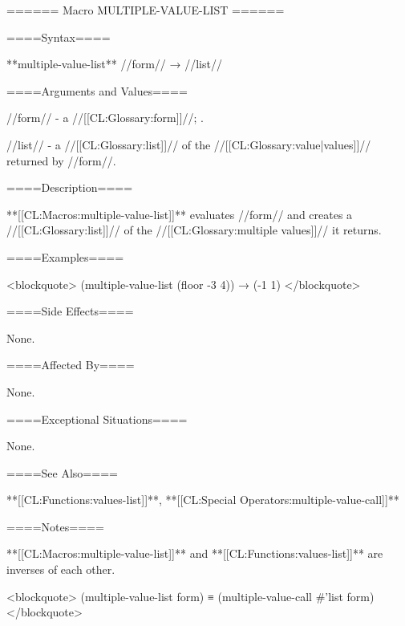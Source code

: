====== Macro MULTIPLE-VALUE-LIST ======

====Syntax====

**multiple-value-list** //form// → //list//

====Arguments and Values====

//form// - a //[[CL:Glossary:form]]//; \evalspecial.

//list// - a //[[CL:Glossary:list]]// of the //[[CL:Glossary:value|values]]// returned by //form//.

====Description====

**[[CL:Macros:multiple-value-list]]** evaluates //form// and creates a //[[CL:Glossary:list]]// of the //[[CL:Glossary:multiple values]]// it returns.

====Examples====

<blockquote> (multiple-value-list (floor -3 4)) → (-1 1) </blockquote>

====Side Effects====

None.

====Affected By====

None.

====Exceptional Situations====

None.

====See Also====

**[[CL:Functions:values-list]]**, **[[CL:Special Operators:multiple-value-call]]**

====Notes====

**[[CL:Macros:multiple-value-list]]** and **[[CL:Functions:values-list]]** are inverses of each other.

<blockquote> (multiple-value-list form) ≡ (multiple-value-call #'list form) </blockquote>

